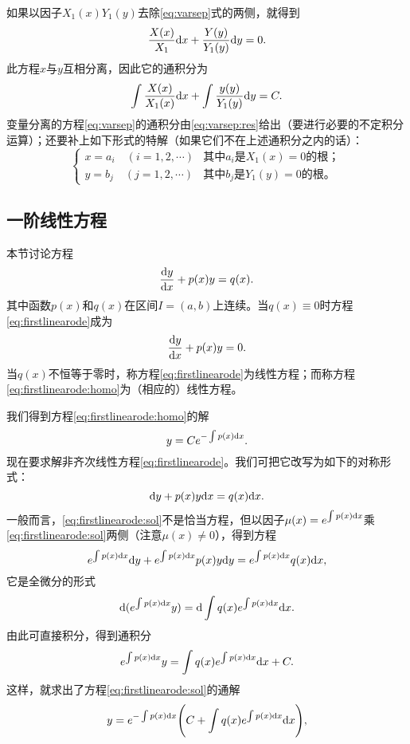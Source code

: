 如果以因子$X_1(x)Y_1(y)$去除\eqref{eq:varsep}式的两侧，就得到\[
\frac{X(x)}{X_1}\mathrm{d} x+\frac{Y(y)}{Y_1(y)}\mathrm{d} y=0.
\]
此方程$x$与$y$互相分离，因此它的通积分为
\begin{equation}\label{eq:varsep:res}
\int\frac{X(x)}{X_1(x)}\mathrm{d} x+\int\frac{y(y)}{Y_1(y)}\mathrm{d} y=C.
\end{equation}
变量分离的方程\eqref{eq:varsep}的通积分由\eqref{eq:varsep:res}给出（要进行必要的不定积分运算）；还要补上如下形式的特解（如果它们不在上述通积分之内的话）：
\begin{equation*}
    \begin{cases}
        x=a_i\quad(i=1,2,\cdots) & \text{其中$a_i$是$X_1(x)=0$的根；} \\
        y=b_j\quad(j=1,2,\cdots) & \text{其中$b_j$是$Y_1(y)=0$的根。}
    \end{cases}
\end{equation*}

\subsection{一阶线性方程}
本节讨论方程
\begin{equation}\label{eq:firstlinearode}
\frac{\mathrm{d} y}{\mathrm{d} x}+p(x)y=q(x).
\end{equation}
其中函数$p(x)$和$q(x)$在区间$I=(a,b)$上连续。当$q(x)\equiv0$时方程\eqref{eq:firstlinearode}成为
\begin{equation}\label{eq:firstlinearode:homo}
\frac{\mathrm{d} y}{\mathrm{d} x}+p(x)y=0.
\end{equation}
当$q(x)$不恒等于零时，称方程\eqref{eq:firstlinearode}为线性方程；而称方程\eqref{eq:firstlinearode:homo}为（相应的）线性方程。

我们得到方程\eqref{eq:firstlinearode:homo}的解
\begin{equation}\label{eq:firstlinearode:homo:sol}
y=Ce^{-\int p(x)\mathrm{d} x}.
\end{equation}
现在要求解非齐次线性方程\eqref{eq:firstlinearode}。我们可把它改写为如下的对称形式：
\begin{equation}\label{eq:firstlinearode:sol}
\mathrm{d} y+p(x)y\mathrm{d} x=q(x)\mathrm{d} x.
\end{equation}
一般而言，\eqref{eq:firstlinearode:sol}不是恰当方程，但以因子$\mu(x)=e^{\int p(x)\mathrm{d} x}$乘\eqref{eq:firstlinearode:sol}两侧（注意$\mu(x)\neq 0$），得到方程
\[
e^{\int p(x)\mathrm{d} x}\mathrm{d} y+e^{\int p(x)\mathrm{d} x}p(x)y\mathrm{d} y=e^{\int p(x)\mathrm{d} x}q(x)\mathrm{d} x,
\]
它是全微分的形式
\[
\mathrm{d}(e^{\int p(x)\mathrm{d} x}y)=\mathrm{d}\int q(x)e^{\int p(x)\mathrm{d} x}\mathrm{d} x.
\]
由此可直接积分，得到通积分
\[
e^{\int p(x)\mathrm{d} x}y=\int q(x)e^{\int p(x)\mathrm{d} x}\mathrm{d} x+C.
\]
这样，就求出了方程\eqref{eq:firstlinearode:sol}的通解
\begin{equation}\label{eq:firstlinearode:sol2}
y=e^{-\int p(x)\mathrm{d} x}\Bigg(C+\int q(x)e^{\int p(x)\mathrm{d} x}\mathrm{d} x\Bigg),
\end{equation}

